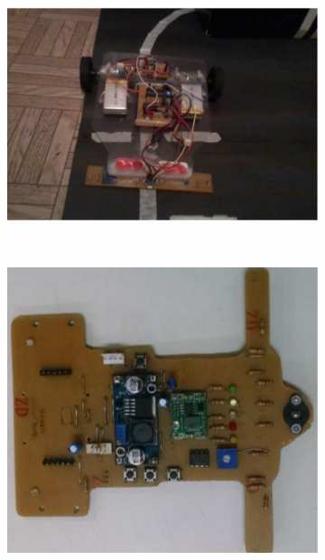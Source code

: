 \begin{figure}[h]
    \centering
    \captionsetup{width=0.83\textwidth,font=footnotesize,textfont=bf}
    \begin{subfigure}[b]{0.4\textwidth}
        \includegraphics[width=\textwidth,height=0.18\textheight]{figuras/allan.png}
        \caption{\centering \label{fig:allan}}
    \end{subfigure}    
    ~ %
    \begin{subfigure}[b]{0.4\textwidth}
        \includegraphics[width=\textwidth,height=0.18\textheight]{figuras/marcio1.png}
        \caption{\centering \label{fig:marcio}}
    \end{subfigure}
    

\end{figure}
